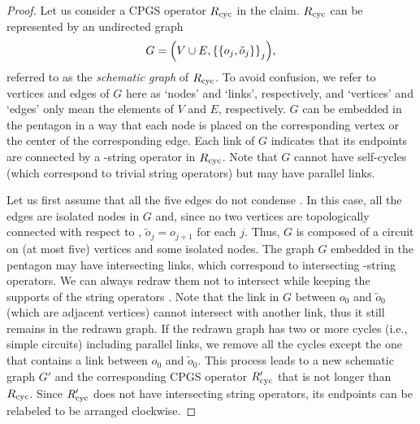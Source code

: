 \documentclass[
 prx,
 reprint,
 superscriptaddress,
 longbibliography,
 dvipsnames
]{revtex4-2}
\begin{document}
\begin{proof}
Let us consider a CPGS operator $R_{\mathrm{cyc}}$ in the claim.
$R_{\mathrm{cyc}}$ can be represented by an undirected graph
\begin{align*}
    G = \qty(V \cup E, \qty{\qty{o_j, \tilde{o}_j}}_j),
\end{align*}
referred to as the \emph{schematic graph} of $R_{\mathrm{cyc}}$.
To avoid confusion, we refer to vertices and edges of $G$ here as `nodes' and `links', respectively, and `vertices' and `edges' only mean the elements of $V$ and $E$, respectively.
$G$ can be embedded in the pentagon in a way that each node is placed on the corresponding vertex or the center of the corresponding edge.
Each link of $G$ indicates that its endpoints are connected by a \gw-string operator in $R_{\mathrm{cyc}}$.
Note that $G$ cannot have self-cycles (which correspond to trivial string operators) but may have parallel links.

Let us first assume that all the five edges do not condense \gw.
In this case, all the edges are isolated nodes in $G$ and, since no two vertices are topologically connected with respect to \gw, $\tilde{o}_j = o_{j+1}$ for each $j$.
Thus, $G$ is composed of a circuit on (at most five) vertices and some isolated nodes.
The graph $G$ embedded in the pentagon may have intersecting links, which correspond to intersecting \gw-string operators.
We can always redraw them not to intersect while keeping the supports of the string operators \cite{kesselring2022anyon}.
Note that the link in $G$ between $o_0$ and $\tilde{o}_0$ (which are adjacent vertices) cannot intersect with another link, thus it still remains in the redrawn graph.
If the redrawn graph has two or more cycles (i.e., simple circuits) including parallel links, we remove all the cycles except the one that contains a link between $o_0$ and $\tilde{o}_0$.
This process leads to a new schematic graph $G'$ and the corresponding CPGS operator $R'_{\mathrm{cyc}}$ that is not longer than $R_{\mathrm{cyc}}$.
Since $R'_{\mathrm{cyc}}$ does not have intersecting string operators, its endpoints can be relabeled to be arranged clockwise.


\end{proof}
\end{document}
